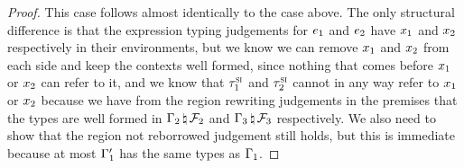 \begin{proof}
  This case follows almost identically to the  case above. The
  only structural difference is that the expression typing judgements for
  $e_1$ and $e_2$ have $x_1$ and $x_2$ respectively in their
  environments, but we know we can remove $x_1$ and $x_2$ from each side
  and keep the contexts well formed, since nothing that comes before $x_1$
  or $x_2$ can refer to it, and we know that $\tau^\textsc{si}_1$ and $\tau^\textsc{si}_2$
  cannot in any way refer to $x_1$ or $x_2$ because we have from the
  region rewriting judgements in the premises that the types are well formed in
  $\Gamma_2 \, \natural \, \mathcal{F}_2$ and
  $\Gamma_3 \, \natural \, \mathcal{F}_3$ respectively. We also need to show that the region not reborrowed judgement still holds, but this is immediate because at most $\Gamma_1^\prime$ has the same types as $\Gamma_1$. 
  
  \vspace{1em}
  \noindent {} \vspace{1em}


\end{proof}
